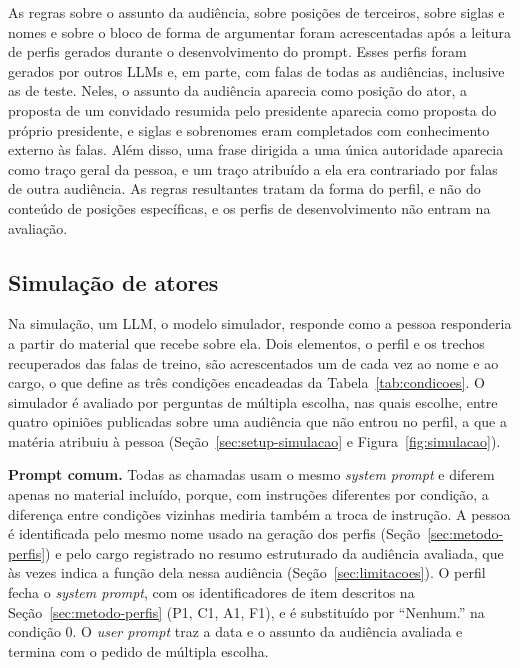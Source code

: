 As regras sobre o assunto da audiência, sobre posições de terceiros, sobre siglas e nomes e sobre o
bloco de forma de argumentar foram acrescentadas após a leitura de perfis gerados durante o desenvolvimento do
prompt. Esses perfis foram gerados por outros LLMs e, em parte, com falas de todas as audiências,
inclusive as de teste. Neles, o assunto da audiência aparecia como posição do ator, a proposta de um
convidado resumida pelo presidente aparecia como proposta do próprio presidente, e siglas e sobrenomes
eram completados com conhecimento externo às falas. Além disso, uma frase dirigida a uma única
autoridade aparecia como traço geral da pessoa, e um traço atribuído a ela era contrariado por falas
de outra audiência. As regras resultantes tratam da forma do perfil, e não do conteúdo de posições
específicas, e os perfis de desenvolvimento não entram na avaliação.

\subsection{Simulação de atores}
\label{sec:metodo-simulacao}

Na simulação, um LLM, o modelo simulador, responde como a pessoa responderia a partir do material
que recebe sobre ela. Dois elementos, o perfil e os trechos recuperados das falas de treino, são
acrescentados um de cada vez ao nome e ao cargo, o que define as três condições encadeadas da
Tabela~\ref{tab:condicoes}. O simulador é avaliado por perguntas de múltipla escolha, nas quais
escolhe, entre quatro opiniões publicadas sobre uma audiência que não entrou no perfil, a que a
matéria atribuiu à pessoa (Seção~\ref{sec:setup-simulacao} e Figura~\ref{fig:simulacao}).



\textbf{Prompt comum.} Todas as chamadas usam o mesmo \textit{system prompt} e diferem apenas no
material incluído, porque, com instruções diferentes por
condição, a diferença entre condições vizinhas mediria também a troca de instrução. A pessoa é
identificada pelo mesmo nome usado na geração dos perfis (Seção~\ref{sec:metodo-perfis}) e pelo cargo
registrado no resumo estruturado da audiência avaliada, que às vezes indica a função dela nessa
audiência (Seção~\ref{sec:limitacoes}). O perfil fecha o \textit{system prompt}, com os
identificadores de item descritos na Seção~\ref{sec:metodo-perfis} (P1, C1, A1, F1), e é
substituído por ``Nenhum.'' na condição 0. O \textit{user prompt} traz a data e o assunto da
audiência avaliada e termina com o pedido de múltipla escolha.


